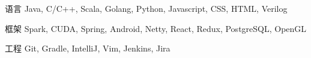 


\begin{cvskills}


\cvskill
{语言} %
{Java, C/C++, Scala, Golang, Python, Javascript, CSS, HTML, Verilog} %


\cvskill
{框架} %
{Spark, CUDA, Spring, Android, Netty, React, Redux, PostgreSQL, OpenGL} %


\cvskill
{工程} %
{Git, Gradle, IntelliJ, Vim, Jenkins, Jira} %


\end{cvskills}